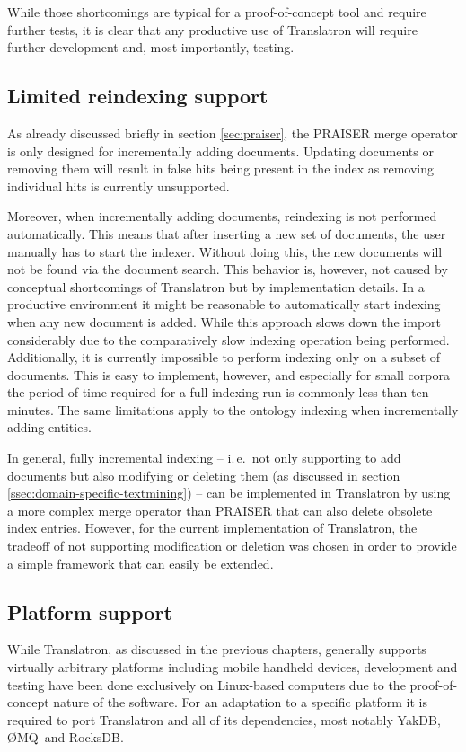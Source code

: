 \documentclass[a4paper, 12pt, twoside, reqn]{report}
\numberwithin{figure}{chapter}
\newtheorem[L]{boxedDefinition}{Definition}
\newtheorem[L]{boxedExample}{Example}
\newcommand{\ie}{i.\,e.\ }
\newcommand{\ZMQ}{{\O}MQ}
\begin{document}
While those shortcomings are typical for a proof-of-concept tool and require further tests, it is clear that any productive use of Translatron will require further development and, most importantly, testing.

\subsection{Limited reindexing support}

As already discussed briefly in section \ref{sec:praiser}, the PRAISER merge operator is only designed for incrementally adding documents. Updating documents or removing them will result in false hits being present in the index as removing individual hits is currently unsupported.

Moreover, when incrementally adding documents, reindexing is not performed automatically. This means that after inserting a new set of documents, the user manually has to start the indexer. Without doing this, the new documents will not be found via the document search. This behavior is, however, not caused by conceptual shortcomings of Translatron but by implementation details. In a productive environment it might be reasonable to automatically start indexing when any new document is added. While this approach slows down the import considerably due to the comparatively slow indexing operation being performed. Additionally, it is currently impossible to perform indexing only on a subset of documents. This is easy to implement, however, and especially for small corpora the period of time required for a full indexing run is commonly less than ten minutes. The same limitations apply to the ontology indexing when incrementally adding entities.

In general, fully incremental indexing -- \ie not only supporting to add documents but also modifying or deleting them (as discussed in section \ref{ssec:domain-specific-textmining}) -- can be implemented in Translatron by using a more complex merge operator than PRAISER that can also delete obsolete index entries. However, for the current implementation of Translatron, the tradeoff of not supporting modification or deletion was chosen in order to provide a simple framework that can easily be extended.

\subsection{Platform support}

While Translatron, as discussed in the previous chapters, generally supports virtually arbitrary platforms including mobile handheld devices, development and testing have been done exclusively on Linux-based computers due to the proof-of-concept nature of the software. For an adaptation to a specific platform it is required to port Translatron and all of its dependencies, most notably YakDB, \ZMQ\ and RocksDB.
\end{document}
